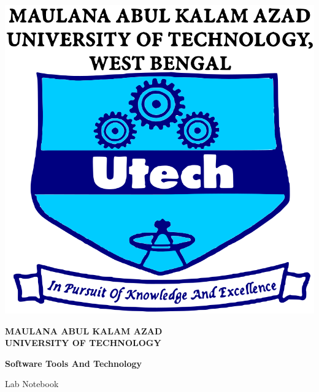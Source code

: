 \begin{titlepage}

    \begin{center}
        \begin{minipage}{0.1\textwidth}
            \includegraphics[width=\linewidth]{images/makaut_logo.png}
        \end{minipage}
        \hspace{1em}
        \begin{minipage}{0.8\textwidth}
            \fontsize{14}{20}\selectfont
            \Large{\textbf{MAULANA ABUL KALAM AZAD\\
            UNIVERSITY OF TECHNOLOGY}}
        \end{minipage}
    \end{center}
    
    \vspace{4em}
    
    \begin{center}
        \Large
        \textbf{Software Tools And Technology}
        
        \vspace{1em}
        
        \Large
        Lab Notebook
    \end{center}
    

\end{titlepage}
